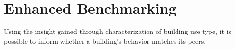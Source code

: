 \section{Enhanced Benchmarking}
\label{sec:results_benchmarking}

Using the insight gained through characterization of building use type, it is possible to inform whether a building's behavior matches its peers.